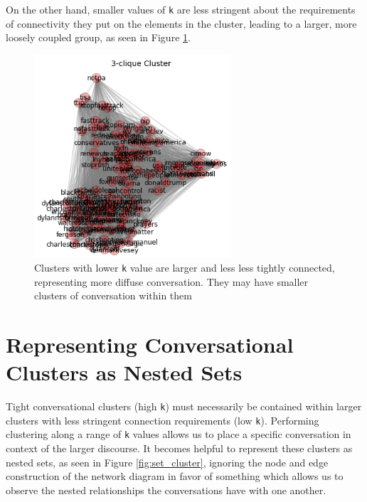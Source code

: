 \documentclass[12pt]{article}
\begin{document}
On the other hand, smaller values of \texttt{k} are less stringent about the requirements of connectivity they put on the elements in the cluster, leading to a larger, more loosely coupled group, as seen in Figure \ref{fig:3clique}.

\begin{figure}[!ht]
  \centering
    \includegraphics[width=0.65\textwidth]{F4_3clique_clusters.png}
    \caption{Clusters  with  lower  \texttt{k}  value  are  larger  and  less  less  tightly  connected,  representing  more  diffuse  conversation.  They  may  have  smaller  clusters  of  conversation within them}
  \label{fig:3clique}
\end{figure}

\section{Representing Conversational Clusters as Nested Sets}

Tight conversational clusters (high \texttt{k}) must necessarily be contained within larger clusters with less stringent connection requirements (low \texttt{k}). Performing clustering along a range of \texttt{k} values allows us to place a specific conversation in context of the larger discourse. 
It becomes helpful to represent these clusters as nested sets, as seen in Figure \ref{fig:set_cluster}, ignoring the node and edge construction of the network diagram in favor of something which allows us to observe the nested relationships the conversations have with one another.
\end{document}

